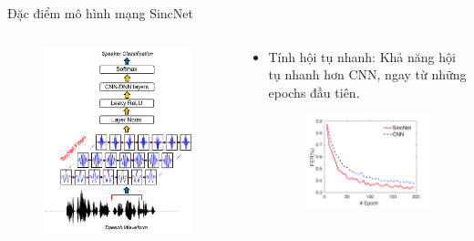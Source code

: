 \documentclass[11pt]{beamer}
\begin{document}
\begin{frame}{Đặc điểm mô hình mạng SincNet}
	\begin{columns}
		\begin{column}{0.47\textwidth}
			\begin{figure}[H]
				\includegraphics[width=0.9\linewidth]{images/SincNet.png}
			\end{figure}
		\end{column}
		\begin{column}{0.5\textwidth}
		\begin{itemize}
			\item Tính hội tụ nhanh: Khả năng hội tụ nhanh hơn CNN, ngay từ những epochs đầu tiên.
			\begin{figure}[H]
				\includegraphics[width=0.9\linewidth]{images/fast_convergence.png}
			\end{figure}
		\end{itemize}
		\end{column}
	\end{columns}
\end{frame}
\end{document}
